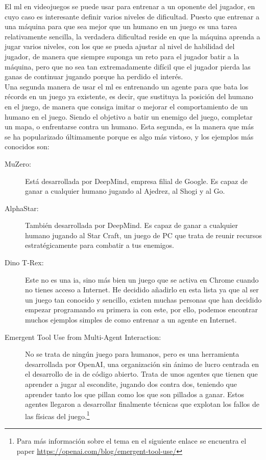 El \gls{ml} en videojuegos se puede usar para entrenar a un oponente del jugador, en cuyo caso es interesante definir varios niveles de dificultad. Puesto que entrenar a una máquina para que sea mejor que un humano en un juego es una tarea relativamente sencilla, la verdadera dificultad reside en que la máquina aprenda a jugar varios niveles, con los que se pueda ajustar al nivel de habilidad del jugador, de manera que siempre suponga un reto para el jugador batir a la máquina, pero que no sea tan extremadamente difícil que el jugador pierda las ganas de continuar jugando porque ha perdido el interés.
\\
Una segunda manera de usar el \gls{ml} es entrenando un agente para que bata los récords en un juego ya existente, es decir, que sustituya la posición del humano en el juego, de manera que consiga imitar o mejorar el comportamiento de un humano en el juego. Siendo el objetivo a batir un enemigo del juego, completar un mapa, o enfrentarse contra un humano. Esta segunda, es la manera que más se ha popularizado últimamente porque es algo más vistoso, y los ejemplos más conocidos son:
\begin{description}
	\item[MuZero:] Está desarrollada por DeepMind, empresa filial de  Google. Es capaz de ganar a cualquier humano jugando al Ajedrez, al Shogi y al Go.
	\item[AlphaStar:] También desarrollada por DeepMind. Es capaz de ganar a cualquier humano jugando al Star Craft, un juego de PC que trata de reunir recursos estratégicamente para combatir a tus enemigos.
	\item[Dino T-Rex:] Este no es una \gls{ia}, sino más bien un juego que se activa en Chrome cuando no tienes acceso a Internet. He decidido añadirlo en esta lista ya que al ser un juego tan conocido y sencillo, existen muchas personas que han decidido empezar programando su primera \gls{ia} con este, por ello, podemos encontrar muchos ejemplos simples de como entrenar a un agente en Internet.
	\item[Emergent Tool Use from Multi-Agent Interaction:] No se trata de ningún juego para humanos, pero es una herramienta desarrollada por OpenAI, una organización sin ánimo de lucro centrada en el desarrollo de \gls{ia} de código abierto. Trata de unos agentes que tienen que aprender a jugar al escondite, jugando dos contra dos, teniendo que aprender tanto los que pillan como los que son pillados a ganar. Estos agentes llegaron a desarrollar finalmente técnicas que explotan los fallos de las físicas del juego.\footnote{Para más información sobre el tema en el siguiente enlace se encuentra el paper \url{https://openai.com/blog/emergent-tool-use/}}
\end{description}